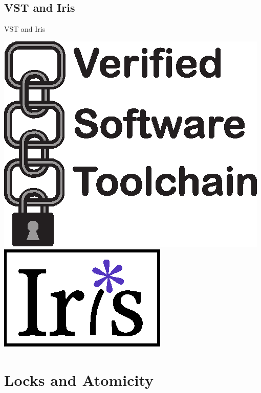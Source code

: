 \documentclass[professionalfonts, xcolor=table]{beamer}
\begin{document}
\subsection{VST and Iris}
\begin{frame}{VST and Iris}
  \begin{center}
    \includegraphics[height=.4\textheight]{vst.eps}
    \hspace{2ex}
    \includegraphics[height=.4\textheight]{iris.eps}
  \end{center}

\end{frame}

\section{Locks and Atomicity}
\end{document}

